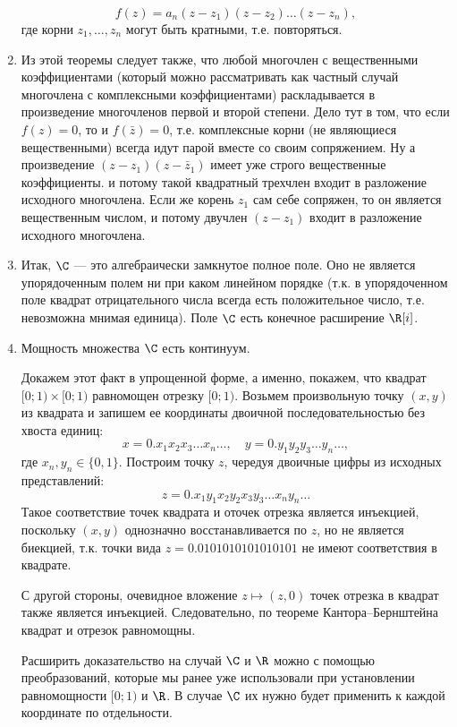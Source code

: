 \begin{enumerate}
\begin{thrm}
$$
f(z)=a_n(z-z_1)(z-z_2)\dots(z-z_n),
$$
где корни $z_1,\dots,z_n$ могут быть кратными, т.е. повторяться.
\end{thrm}
\item Из этой теоремы следует также, что любой многочлен с вещественными коэффициентами (который можно рассматривать как частный случай многочлена с комплексными коэффициентами) раскладывается в произведение многочленов первой и второй степени. Дело тут в том, что если $f(z)=0$, то и $f(\bar z)=0$, т.е. комплексные корни (не являющиеся вещественными) всегда идут парой вместе со своим сопряжением. Ну а произведение $(z-z_1)(z-\bar z_1)$ имеет уже строго вещественные коэффициенты. и потому такой квадратный трехчлен входит в разложение исходного многочлена. Если же корень $z_1$ сам себе сопряжен, то он является вещественным числом, и потому двучлен $(z-z_1)$ входит в разложение исходного многочлена.
\item Итак, $\C$ --- это алгебраически замкнутое полное поле. Оно не является упорядоченным полем ни при каком линейном порядке (т.к. в упорядоченном поле квадрат отрицательного числа всегда есть положительное число, т.е. невозможна мнимая единица). Поле $\C$ есть конечное расширение $\R[i]$.




\item  Мощность множества $\C$ есть континуум.

Докажем этот факт в упрощенной форме, а именно, покажем, что квадрат $[0;1)\times[0;1)$ равномощен отрезку $[0;1)$. Возьмем произвольную точку $(x,y)$ из квадрата и запишем ее координаты двоичной последовательностью без хвоста единиц:
$$
x = 0.x_1x_2x_3\dots x_n\dots,\quad y=0.y_1y_2y_3\dots y_n\dots,
$$
где $x_n,y_n\in\{0,1\}$. Построим точку $z$, чередуя двоичные цифры из исходных представлений:
$$
z = 0.x_1y_1x_2y_2x_3y_3\dots x_ny_n\dots
$$
Такое соответствие точек квадрата и оточек отрезка является инъекцией, поскольку $(x,y)$ однозначно восстанавливается по $z$, но не является биекцией, т.к. точки вида $z=0.0101010101010101$ не имеют соответствия в квадрате.

С другой стороны, очевидное вложение $z\mapsto (z,0)$ точек отрезка в квадрат также является инъекцией. Следовательно, по теореме Кантора--Бернштейна квадрат и отрезок равномощны.

Расширить доказательство на случай $\C$ и $\R$ можно с помощью преобразований, которые мы ранее уже использовали при установлении равномощности $[0;1)$ и $\R$. В случае $\C$ их нужно будет применить к каждой координате по отдельности.


\end{enumerate}
